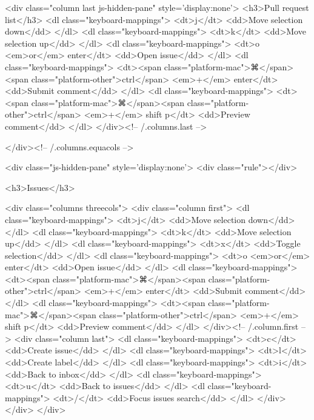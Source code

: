     <div class="column last js-hidden-pane" style='display:none'>
      <h3>Pull request list</h3>
      <dl class="keyboard-mappings">
        <dt>j</dt>
        <dd>Move selection down</dd>
      </dl>
      <dl class="keyboard-mappings">
        <dt>k</dt>
        <dd>Move selection up</dd>
      </dl>
      <dl class="keyboard-mappings">
        <dt>o <em>or</em> enter</dt>
        <dd>Open issue</dd>
      </dl>
      <dl class="keyboard-mappings">
        <dt><span class="platform-mac">⌘</span><span class="platform-other">ctrl</span> <em>+</em> enter</dt>
        <dd>Submit comment</dd>
      </dl>
      <dl class="keyboard-mappings">
        <dt><span class="platform-mac">⌘</span><span class="platform-other">ctrl</span> <em>+</em> shift p</dt>
        <dd>Preview comment</dd>
      </dl>
    </div><!-- /.columns.last -->

  </div><!-- /.columns.equacols -->

  <div class="js-hidden-pane" style='display:none'>
    <div class="rule"></div>

    <h3>Issues</h3>

    <div class="columns threecols">
      <div class="column first">
        <dl class="keyboard-mappings">
          <dt>j</dt>
          <dd>Move selection down</dd>
        </dl>
        <dl class="keyboard-mappings">
          <dt>k</dt>
          <dd>Move selection up</dd>
        </dl>
        <dl class="keyboard-mappings">
          <dt>x</dt>
          <dd>Toggle selection</dd>
        </dl>
        <dl class="keyboard-mappings">
          <dt>o <em>or</em> enter</dt>
          <dd>Open issue</dd>
        </dl>
        <dl class="keyboard-mappings">
          <dt><span class="platform-mac">⌘</span><span class="platform-other">ctrl</span> <em>+</em> enter</dt>
          <dd>Submit comment</dd>
        </dl>
        <dl class="keyboard-mappings">
          <dt><span class="platform-mac">⌘</span><span class="platform-other">ctrl</span> <em>+</em> shift p</dt>
          <dd>Preview comment</dd>
        </dl>
      </div><!-- /.column.first -->
      <div class="column last">
        <dl class="keyboard-mappings">
          <dt>c</dt>
          <dd>Create issue</dd>
        </dl>
        <dl class="keyboard-mappings">
          <dt>l</dt>
          <dd>Create label</dd>
        </dl>
        <dl class="keyboard-mappings">
          <dt>i</dt>
          <dd>Back to inbox</dd>
        </dl>
        <dl class="keyboard-mappings">
          <dt>u</dt>
          <dd>Back to issues</dd>
        </dl>
        <dl class="keyboard-mappings">
          <dt>/</dt>
          <dd>Focus issues search</dd>
        </dl>
      </div>
    </div>
  </div>

